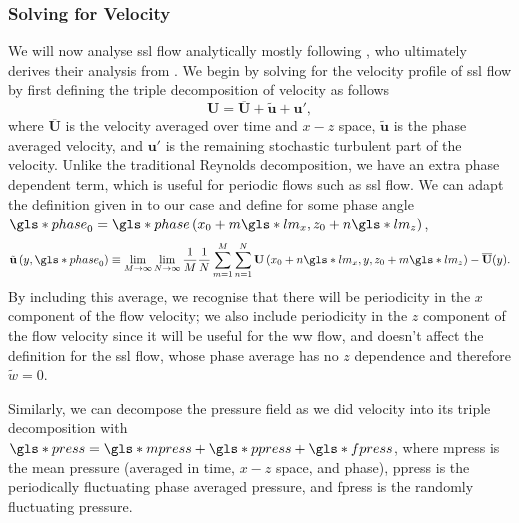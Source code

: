 \subsubsection{Solving for Velocity}
We will now analyse \gls*{ssl} flow analytically mostly following \textcite{chernyshenko2013}, who ultimately derives their analysis from \textcite{viotti2009}. We begin by solving for the velocity profile of \gls*{ssl} flow by first defining the triple decomposition of velocity as follows
\begin{equation}
	\mathbf{U} = \overline{\mathbf{U} }+\tilde{\mathbf{u} }+\mathbf{u'}  
,\end{equation}
where $\overline{\mathbf{U} }$ is the velocity averaged over time and $x-z$ space, $\tilde{\mathbf{u} }$ is the phase averaged velocity, and $\mathbf{u'} $ is the remaining stochastic turbulent part of the velocity. Unlike the traditional Reynolds decomposition, we have an extra phase dependent term, which is useful for periodic flows such as \gls*{ssl} flow. We can adapt the definition given in \cite{baj2015} to our case and define for some phase angle $\gls*{phase}_0=\gls*{phase}\left(x_0+m \gls*{lm}_x,z_0+n \gls*{lm}_z\right)$,
\begin{equation}
	\tilde{\mathbf{u} }\left(y,\gls*{phase}_0\right)\equiv\lim_{M\to\infty}\lim_{N\to\infty}\frac{1}{M}\frac{1}{N} \sum_{m=1}^{M} \sum_{n=1}^{N} \mathbf{U}\left(x_0+n \gls*{lm}_x,y,z_0 +m \gls*{lm}_z\right)-\overline{\mathbf{U} }(y)  
.\end{equation}
By including this average, we recognise that there will be periodicity in the $x$ component of the flow velocity; we also include periodicity in the $z$ component of the flow velocity since it will be useful for the \gls*{ww} flow, and doesn't affect the definition for the \gls*{ssl} flow, whose phase average has no $z$ dependence and therefore $\tilde{w}=0$.

Similarly, we can decompose the pressure field as we did velocity into its triple decomposition with $\gls*{press}=\gls*{mpress}+\gls*{ppress}+\gls*{fpress}$, where \gls*{mpress} is the mean pressure (averaged in time, $x-z$ space, and phase), \gls*{ppress} is the periodically fluctuating phase averaged pressure, and \gls*{fpress} is the randomly fluctuating pressure.

